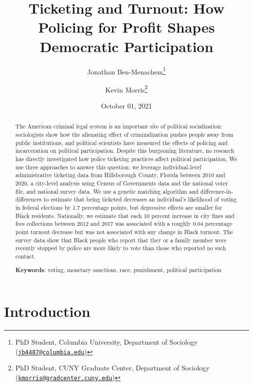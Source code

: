 \documentclass[
  12pt,
]{article}
\title{Ticketing and Turnout: How Policing for Profit Shapes Democratic Participation}
\author{Jonathan Ben-Menachem\footnote{PhD Student, Columbia University, Department of Sociology (\href{mailto:jb4487@columbia.edu}{\nolinkurl{jb4487@columbia.edu}})} \and Kevin Morris\footnote{PhD Student, CUNY Graduate Center, Department of Sociology (\href{mailto:kmorris@gradcenter.cuny.edu}{\nolinkurl{kmorris@gradcenter.cuny.edu}})}}
\date{October 01, 2021}
\begin{document}
\maketitle
\begin{abstract}
The American criminal legal system is an important site of political socialization: sociologists show how the alienating effect of criminalization pushes people away from public institutions, and political scientists have measured the effects of policing and incarceration on political participation. Despite this burgeoning literature, no research has directly investigated how police ticketing practices affect political participation. We use three approaches to answer this question: we leverage individual-level administrative ticketing data from Hillsborough County, Florida between 2010 and 2020, a city-level analysis using Census of Governments data and the national voter file, and national survey data. We use a genetic matching algorithm and difference-in-differences to estimate that being ticketed decreases an individual's likelihood of voting in federal elections by 1.7 percentage points, but depressive effects are smaller for Black residents. Nationally, we estimate that each 10 percent increase in city fines and fees collections between 2012 and 2017 was associated with a roughly 0.04 percentage point turnout decrease but was not associated with any change in Black turnout. The survey data show that Black people who report that they or a family member were recently stopped by police are more likely to vote than those who reported no such contact.

\hfill\break

\textbf{Keywords}: voting, monetary sanctions, race, punishment, political participation
\end{abstract}

\pagebreak

\doublespacing

\hypertarget{introduction}{%
\section*{Introduction}\label{introduction}}
\end{document}
